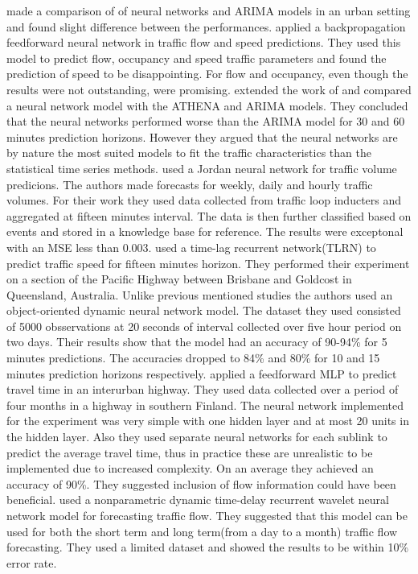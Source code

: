 \citet{clark1993use} made a comparison of of neural networks and ARIMA models in an urban setting
and found slight difference between the performances. \citet{dougherty1997short} applied a
backpropagation feedforward neural network in traffic flow and speed predictions. They used this
model to predict flow, occupancy and speed traffic parameters and found the prediction of speed to
be disappointing. For flow and occupancy, even though the results were not outstanding, were promising.
\citet{kirby1997should} extended the work of \citet{clark1993use} and compared a neural network model
with the ATHENA and ARIMA models. They concluded that the neural networks performed worse than the
ARIMA model for 30 and 60 minutes prediction horizons. However they argued that the neural networks
are by nature the most suited models to fit the traffic characteristics than the statistical time
series methods. \citet{yasdi1999prediction} used a Jordan neural network for traffic volume predicions.
The authors made forecasts for weekly, daily and hourly traffic volumes. For their work they used
data collected from traffic loop inducters and aggregated at fifteen minutes interval. The data is
then further classified based on events and stored in a knowledge base for reference. The results were
exceptonal with an MSE less than 0.003. \citet{dia2001object} used a time-lag recurrent network(TLRN)
to predict traffic speed for fifteen minutes horizon. They performed their experiment on a section
of the Pacific Highway between Brisbane and Goldcost in Queensland, Australia. Unlike previous mentioned
studies the authors used an object-oriented dynamic neural network model. The dataset they used consisted
of 5000 obsservations at 20 seconds of interval collected over five hour period on two days. Their results
show that the model had an accuracy of 90-94\% for 5 minutes predictions. The accuracies dropped
to 84\% and 80\% for 10 and 15 minutes prediction horizons respectively. \citet{innamaa2005short}
applied a feedforward MLP to predict travel time in an interurban highway. They used data collected
over a period of four months in a highway in southern Finland. The neural network implemented for the
experiment was very simple with one hidden layer and at most 20 units in the hidden layer. Also they used
separate neural networks for each sublink to predict the average travel time, thus in practice these
are unrealistic to be implemented due to increased complexity. On an average they achieved an
accuracy of 90\%. They suggested inclusion of flow information could have been beneficial.
\cite{jiang2005dynamic} used a nonparametric dynamic time-delay recurrent wavelet neural network model
for forecasting traffic flow. They suggested that this model can be used for both the short term and
long term(from a day to a month) traffic flow forecasting. They used a limited dataset and showed the
results to be within 10\% error rate.


